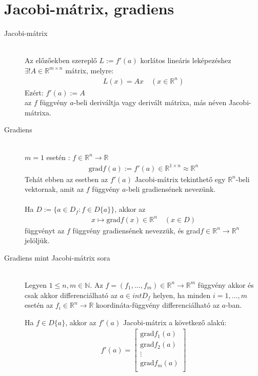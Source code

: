 \documentclass[margin=0px]{article}
\newcommand{\R}{\mathbb{R}}
\begin{document}
\section{Jacobi-mátrix, gradiens}
\begin{description}
    \item[Jacobi-mátrix] \hfill \\
        Az előzőekben szereplő $L := f'(a) $ korlátos lineáris leképezéshez $ \exists!A\in\R^{m\times n}$ mátrix, melyre:
        \begin{align*}
            L(x) = Ax \quad (x\in\R^n)
        \end{align*}
        Ezért:
        $ f'(a) := A $\\
        az $f$ függvény $a$-beli deriváltja vagy derivált mátrixa, más néven Jacobi-mátrixa.
    \item[Gradiens] \hfill \\
        $m = 1$ esetén : $ f \in \R^n \rightarrow \R $
        \begin{align*}
            \textrm{grad}f(a) := f'(a) \in \R^{1\times n} \approx \R^n
        \end{align*}
        Tehát ebben az esetben az $f'(a)$ Jacobi-mátrix tekinthető egy $\R^n$-beli vektornak, amit az $f$ függvény $a$-beli gradiensének nevezünk.
        \\\\
        Ha $ D := \{a \in D_f : f \in D\{a\} \} $, akkor az
        \begin{align*}
            x \mapsto \textrm{grad}f(x) \in \R^n \quad (x \in D)
        \end{align*}
        függvényt az $f$ függvény gradiensének nevezzük, és grad$f \in \R^n \rightarrow \R^n$ jelöljük.
    \item[Gradiens mint Jacobi-mátrix sora] \hfill \\
        Legyen $1 \leq n, m \in \mathbb{N}$. Az $f = (f_1, ..., f_m) \in \R^n \rightarrow \R^m$ függvény akkor és csak akkor differenciálható az $ a \in intD_f$ helyen, ha minden $ i = 1, ..., m $ esetén az
        $f_i \in \R^n \rightarrow \R$  koordináta-függvény differenciálható az $a$-ban.

        Ha $f \in D\{a\}$, akkor az $f'(a)$ Jacobi-mátrix a következő alakú:
        \begin{align*}
            f'(a) =
            \begin{bmatrix}
                \textrm{grad}f_{1}(a) \\
                \textrm{grad}f_{2}(a) \\
                \vdots                \\
                \textrm{grad}f_{m}(a) \\
            \end{bmatrix}
        \end{align*}
\end{description}
\end{document}
